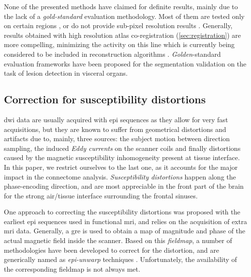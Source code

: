 None of the presented methods have claimed for definite results, mainly due to the lack of 
a \emph{gold-standard} evaluation methodology. Most of them are tested only on certain
regions , or do not provide sub-pixel resolution results
\citep{hadjiprocopis_unbiased_2005,liu_brain_2007,awate_multivariate_2008,lu_segmentation_2008,
han_experimental_2009}. Generally, results obtained with high resolution atlas co-registration
(\autoref{sec:registration}) are more compelling, minimizing the activity on this line which is 
currently being considered to be included in reconstruction algorithms 
\citep{kumazawa_improvement_2013}. \emph{Golden}-standard evaluation frameworks have been 
proposed for the segmentation validation \citep{jha_task-based_2012} on the task of lesion 
detection in visceral organs.

\subsection{Correction for susceptibility distortions}
\label{sec:distortion}

\gls{dwi} data are usually acquired with \gls{epi} sequences 
as they allow for very fast acquisitions, but they are known to 
suffer from geometrical distortions and artifacts due to, mainly,
three sources: the subject motion between direction sampling, the 
induced \emph{Eddy currents} on the scanner coils and finally
distortions caused by the magnetic susceptibility inhomogeneity
present at tissue interface. In this paper, we restrict ourselves to
the last one, as it accounts for the major impact in the connectome
analysis. \emph{Susceptibility distortions} happen along the 
phase-encoding direction, and are most appreciable in the front part of 
the brain for the strong air/tissue interface surrounding the frontal sinuses.

One approach to correcting the susceptibility distortions was proposed
with the earliest \gls{epi} sequences used in functional \gls{mri}, and
relies on the acquisition of extra \gls{mri} data. Generally, a \gls{gre} is used to 
obtain a map of magnitude and phase of the actual magnetic field inside the
scanner. Based on this \emph{fieldmap}, a number of methodologies have 
been developed to correct for the distortion, and are generically named as 
\emph{\gls{epi}-unwarp} techniques \cite{holland_efficient_2010,
hsu_correction_2009,jezzard_characterization_2005, reber_correction_2005}. 
Unfortunately, the availability of the corresponding fieldmap is not always
met.

